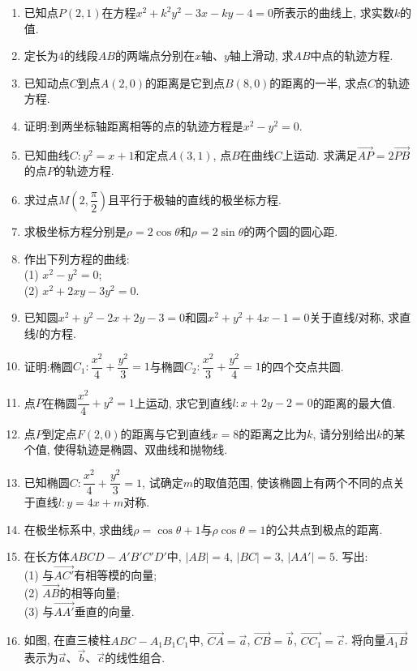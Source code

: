 \documentclass[10pt,a4paper]{article}
\begin{document}
\begin{enumerate}[1.]
\item 已知点$P(2, 1)$在方程$x^2+k^2y^2-3x-ky-4=0$所表示的曲线上, 求实数$k$的值.
\item 定长为$4$的线段$AB$的两端点分别在$x$轴、$y$轴上滑动, 求$AB$中点的轨迹方程.
\item 已知动点$C$到点$A(2, 0)$的距离是它到点$B(8, 0)$的距离的一半, 求点$C$的轨迹方程.
\item 证明:到两坐标轴距离相等的点的轨迹方程是$x^2-y^2=0$.
\item 已知曲线$C: y^2=x+1$和定点$A(3, 1)$, 点$B$在曲线$C$上运动. 求满足$\overrightarrow{AP}=2\overrightarrow{PB}$的点$P$的轨迹方程.
\item 求过点$M(2, \dfrac \pi 2)$且平行于极轴的直线的极坐标方程.
\item 求极坐标方程分别是$\rho=2\cos \theta$和$\rho=2\sin \theta$的两个圆的圆心距.
\item 作出下列方程的曲线:\\
(1) $x^2-y^2=0$;\\
(2) $x^2+2xy-3y^2=0$.
\item 已知圆$x^2+y^2-2x+2y-3=0$和圆$x^2+y^2+4x-1=0$关于直线$l$对称, 求直线$l$的方程.
\item 证明:椭圆$C_1: \dfrac{x^2}4+\dfrac{y^2}3=1$与椭圆$C_2: \dfrac{x^2}3+\dfrac{y^2}4=1$的四个交点共圆.
\item 点$P$在椭圆$\dfrac{x^2}4+y^2=1$上运动, 求它到直线$l: x+2y-2=0$的距离的最大值.
\item 点$P$到定点$F(2, 0)$的距离与它到直线$x=8$的距离之比为$k$, 请分别给出$k$的某个值, 使得轨迹是椭圆、双曲线和抛物线.
\item 已知椭圆$C: \dfrac{x^2}4+\dfrac{y^2}3=1$, 试确定$m$的取值范围, 使该椭圆上有两个不同的点关于直线$l: y=4x+m$对称.
\item 在极坐标系中, 求曲线$\rho=\cos \theta +1$与$\rho \cos \theta =1$的公共点到极点的距离.
\item 在长方体$ABCD-A'B'C'D'$中, $|AB|=4$, $|BC|=3$, $|AA'|=5$. 写出:\\(1) 与$\overrightarrow{AC'}$有相等模的向量;\\
(2) $\overrightarrow{AB}$的相等向量;\\
(3) 与$\overrightarrow{AA'}$垂直的向量.
\item 如图, 在直三棱柱$ABC-A_1B_1C_1$中, $\overrightarrow{CA}=\overrightarrow a$, $\overrightarrow{CB}=\overrightarrow b$, $\overrightarrow{CC_1}=\overrightarrow c$. 将向量$\overrightarrow{A_1B}$表示为$\overrightarrow a$、$\overrightarrow b$、$\overrightarrow c$的线性组合.
\begin{center}

\end{center}
\end{enumerate}
\end{document}
